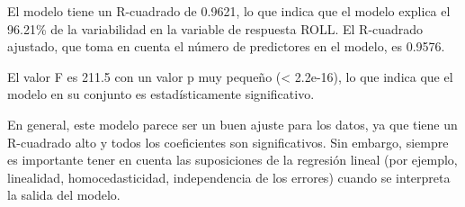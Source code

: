 \documentclass[
]{article}
\begin{document}
El modelo tiene un R-cuadrado de 0.9621, lo que indica que el modelo
explica el 96.21\% de la variabilidad en la variable de respuesta ROLL.
El R-cuadrado ajustado, que toma en cuenta el número de predictores en
el modelo, es 0.9576.

El valor F es 211.5 con un valor p muy pequeño (\textless{} 2.2e-16), lo
que indica que el modelo en su conjunto es estadísticamente
significativo.

En general, este modelo parece ser un buen ajuste para los datos, ya que
tiene un R-cuadrado alto y todos los coeficientes son significativos.
Sin embargo, siempre es importante tener en cuenta las suposiciones de
la regresión lineal (por ejemplo, linealidad, homocedasticidad,
independencia de los errores) cuando se interpreta la salida del modelo.
\end{document}
